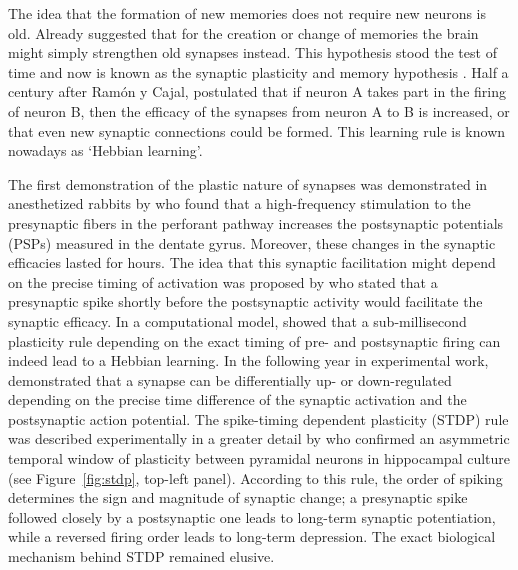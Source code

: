     The idea that the formation of new memories does not require new neurons is
    old. Already \cite{Cajal1894} suggested that for the creation or change of
    memories the brain might simply strengthen old synapses instead. This
    hypothesis stood the test of time and now is known as the synaptic
    plasticity and memory hypothesis \citep{Martin2000, Takeuchi2014}. Half a
    century after Ram\'{o}n y Cajal, \cite{Hebb49} postulated that if neuron A
    takes part in the firing of neuron B, then the efficacy of the synapses from
    neuron A to B is increased, or that even new synaptic connections could be
    formed. This learning rule is known nowadays as `Hebbian learning'.

    The first demonstration of the plastic nature of synapses was demonstrated
    in anesthetized rabbits by \cite{Lomo1966} who found that a high-frequency
    stimulation to the presynaptic fibers in the perforant pathway increases
    the postsynaptic potentials (PSPs) measured in the dentate gyrus. Moreover,
    these changes in the synaptic efficacies lasted for hours. The idea that
    this synaptic facilitation might depend on the precise timing of activation
    was proposed by \cite{Taylor1973} who stated that a presynaptic spike
    shortly before the postsynaptic activity would facilitate the synaptic
    efficacy. In a computational model, \cite{Gerstner1996} showed that a
    sub-millisecond plasticity rule depending on the exact timing of pre- and
    postsynaptic firing can indeed lead to a Hebbian learning. In the following
    year in experimental work, \cite{Markram1997} demonstrated that a synapse
    can be differentially up- or down-regulated depending on the precise time
    difference of the synaptic activation and the postsynaptic action
    potential. The spike-timing dependent plasticity (STDP) rule was described
    experimentally in a greater detail by \cite{Bi1998} who confirmed an
    asymmetric temporal window of plasticity between pyramidal neurons in
    hippocampal culture (see Figure~\ref{fig:stdp}, top-left panel). According to this
    rule, the order of spiking determines the sign and magnitude of synaptic
    change; a presynaptic spike followed closely by a postsynaptic one leads to
    long-term synaptic potentiation, while a reversed firing order leads to
    long-term depression. The exact biological mechanism behind STDP remained
    elusive.

